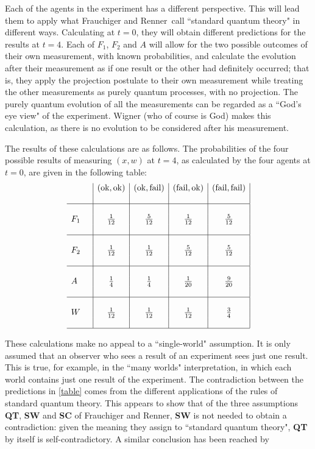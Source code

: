 \documentclass[12pt,reqno]{article}
\newcommand{\ok}{\text{ok}}
\newcommand{\fail}{\text{fail}}
\renewcommand{\(}{\left(}
\renewcommand{\)}{\right)}
\renewcommand{\.}{\centerdot}
\newcommand{\1}{\mathbf{1}}
\newcommand{\<}{\langle}
\renewcommand{\>}{\rangle}
\newcommand{\FR}{Frauchiger and Renner}
\theoremstyle{definition}
\theoremstyle{remark}
\numberwithin{equation}{section}
\begin{document}
Each of the agents in the experiment has a different perspective. This will lead them to apply what \FR \ call ``standard quantum theory" in different ways. Calculating at $t = 0$, they will obtain different predictions for the results at $t = 4$. Each of $F_1$, $F_2$ and $A$ will allow for the two possible outcomes of their own measurement, with known probabilities, and calculate the evolution after their measurement as if one result or the other had definitely occurred; that is, they apply the projection postulate to their own measurement while treating the other measurements as purely quantum processes, with no projection. The purely quantum evolution of all the measurements can be regarded as a ``God's eye view" of the experiment. Wigner (who of course is God) makes this calculation, as there is no evolution to be considered after his measurement.

The results of these calculations are as follows. The probabilities of the four possible results of measuring $(x,w)$ at $t = 4$, as calculated by the four agents at $t = 0$, are given in the following table:
\[\label{table}
\begin{array}{l|c|c|c|c|}{}& (\ok,\ok) & (\ok,\fail) & (\fail,\ok) & (\fail,\fail) \\&&&&\\\hline&&&&\\
F_1\quad  &\frac{1}{12}&\frac{5}{12}&\frac{1}{12}&\frac{5}{12}\\&&&&\\\hline &&&&\\
F_2\quad &\frac{1}{12}&\frac{1}{12}&\frac{5}{12}&\frac{5}{12}\\&&&&\\ \hline &&&&\\
A\quad &\frac{1}{4}&\frac{1}{4}&\frac{1}{20}&\frac{9}{20}\\&&&&\\\hline &&&&\\
W\quad &\frac{1}{12}&\frac{1}{12}&\frac{1}{12}&\frac{3}{4}\\&&&&\\\hline
\end{array}
\]

These calculations make no appeal to a ``single-world" assumption. It is only assumed that an observer who sees a result of an experiment sees just one result. This is true, for example, in the ``many worlds" interpretation, in which each world contains just one result of the experiment. The contradiction between the predictions in \eqref{table} comes from the different applications of the rules of standard quantum theory. This appears to show that of the three assumptions {\bf QT}, {\bf SW} and {\bf SC} of \FR, {\bf SW} is not needed to obtain a contradiction: given the meaning they assign to ``standard quantum theory", {\bf QT} by itself is self-contradictory. A similar conclusion has been reached by \cite{GertrudeStein}
\end{document}
